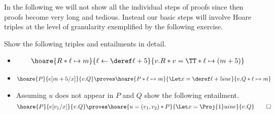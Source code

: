 In the following we will not show all the individual steps of proofs since
then proofs become very long and tedious.
Instead our basic steps will involve Hoare triples at the level of
granularity exemplified by the following exercise.
\begin{exercise}
  \label{exercise:basic-building-blocks}
  Show the following triples and entailments in detail.
  \begin{itemize}
  \item
    \begin{align*}
      \hoare{R \ast \ell \pointsto m}{\ell \gets \deref \ell + 5}{v.R \ast v=\TT \ast \ell \pointsto (m + 5)}
    \end{align*}
  \item 
    \begin{align*}
      \hoare{P}{e[m+5/x]}{v.Q}
      \proves
      \hoare{P \ast \ell \pointsto m}{\Let x = \deref\ell + 5 in e}{v.Q \ast \ell \pointsto m}
    \end{align*}
  \item Assuming $u$ does not appear in $P$ and $Q$ show the following entailment.
    \begin{displaymath}
      \hoare{P}{e[v_1/x]}{v.Q}
      \proves
      \hoare{u = (v_1,v_2) \ast P}{\Let x = \Proj{1}u in e}{v.Q}
      \qedhere
    \end{displaymath}
  \end{itemize}
\end{exercise}

